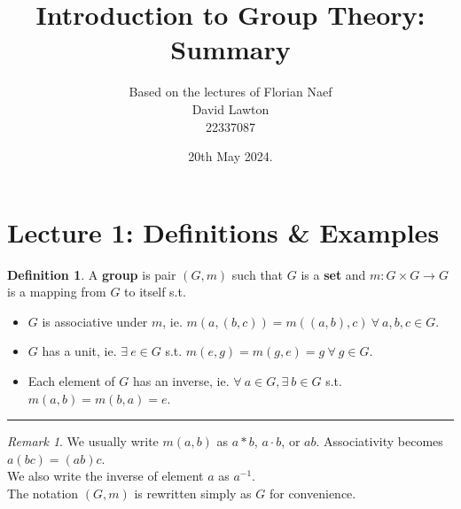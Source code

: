 \documentclass{article}
\title{Introduction to Group Theory: Summary}
\author{Based on the lectures of Florian Naef\\David Lawton\\22337087}
\date{20th May 2024.}
\theoremstyle{definition}
\newtheorem{definition}{Definition}[section]
\theoremstyle{remark}
\newtheorem*{remark}{Remark}
\begin{document}
\maketitle
\vfill
\tableofcontents

\newpage

\section{Lecture 1: Definitions \& Examples}
\begin{definition}
	A \textbf{group} is pair $(G,m)$ such that $G$ is a \textbf{set} and $m: G\times G \rightarrow G$ is a mapping from $G$ to itself s.t.
\end{definition}
\begin{itemize}
	\item $G$ is associative under $m$, ie. $m(a,(b,c))=m((a,b),c) ~\forall ~a,b,c\in G$.
	\item $G$ has a unit, ie. $\exists ~e\in G$ s.t. $ m(e,g)=m(g,e)=g~\forall ~ g\in G$.
	\item Each element of $G$ has an inverse, ie. $\forall~a\in G, \exists ~b\in G$ s.t. $ m(a,b)=m(b,a)=e$.
\end{itemize}
\hrule
\vspace{3mm}
\begin{remark}
	We usually write $m(a,b)$ as $a*b$, $ a\cdot b$, or $ab$. Associativity becomes $a(bc)=(ab)c$. \\ We also write the inverse of element $a$ as $a^{-1}$. \\ The notation $(G,m) $ is rewritten simply as $G$ for convenience.\\
\end{remark}
\end{document}
